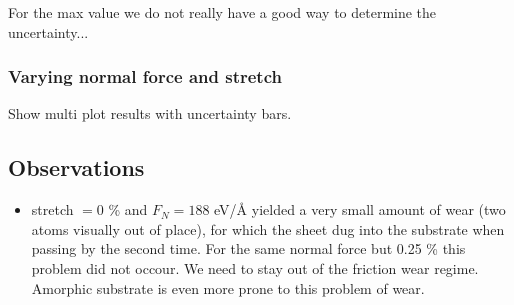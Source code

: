 For the max value we do not really have a good way to determine the uncertainty...


\subsubsection{Varying normal force and stretch}

Show multi plot results with uncertainty bars. 


\newpage
\subsection*{Observations}



\begin{itemize}
  \item stretch $= 0$ \% and $F_N = 188$ eV/Å yielded a very small amount of wear (two atoms visually out of place), for which the sheet dug into the substrate when passing by the second time. For the same normal force but 0.25 \% this problem did not occour. We need to stay out of the friction wear regime. Amorphic substrate is even more prone to this problem of wear.
\end{itemize}